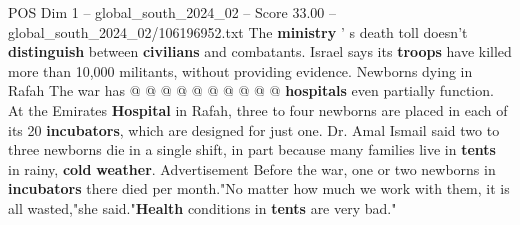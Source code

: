 \begin{textsample}{POS Dim 1 – global\_south\_2024\_02 – Score 33.00 – global\_south\_2024\_02/106196952.txt}
The \textbf{ministry} ' s death toll doesn't \textbf{distinguish} between \textbf{civilians} and combatants.
Israel says its \textbf{troops} have killed more than 10,000 militants, without providing evidence.
Newborns dying in Rafah The war has @ @ @ @ @ @ @ @ @ @ \textbf{hospitals} even partially function.
At the Emirates \textbf{Hospital} in Rafah, three to four newborns are placed in each of its 20 \textbf{incubators}, which are designed for just one.
Dr.
Amal Ismail said two to three newborns die in a single shift, in part because many families live in \textbf{tents} in rainy, \textbf{cold} \textbf{weather}.
Advertisement Before the war, one or two newborns in \textbf{incubators} there died per month."No matter how much we work with them, it is all wasted,"she said."\textbf{Health} conditions in \textbf{tents} are very bad."

\end{textsample}
